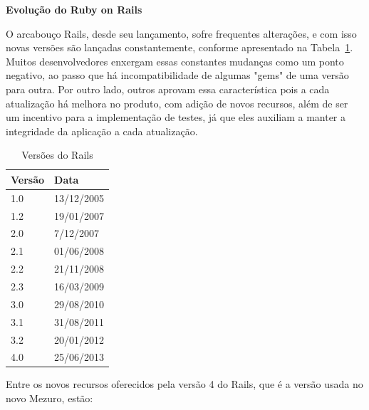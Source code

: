 
\textbf{Evolução do Ruby on Rails}

O arcabouço Rails, desde seu lançamento, sofre frequentes alterações, e com isso novas versões são lançadas constantemente, conforme apresentado na Tabela~\ref{tab:rails_versions}. Muitos desenvolvedores enxergam essas constantes mudanças como um ponto negativo, ao passo que há incompatibilidade de algumas "gems" de uma versão para outra. Por outro lado, outros aprovam essa característica pois a cada atualização há melhora no produto, com adição de novos recursos, além de ser um incentivo para a implementação de testes, já que eles auxiliam a manter a integridade da aplicação a cada atualização.

\begin{table}[H]
\begin{center}
    \begin{tabular}{ | l | l |}
    \hline
    Versão & Data \\ \hline
    1.0 & 13/12/2005 \\ \hline
    1.2 & 19/01/2007 \\ \hline
    2.0 & 7/12/2007 \\ \hline
    2.1 & 01/06/2008 \\ \hline
    2.2 & 21/11/2008 \\ \hline
    2.3 & 16/03/2009 \\ \hline
    3.0 & 29/08/2010 \\ \hline
    3.1 & 31/08/2011 \\ \hline
    3.2 & 20/01/2012 \\ \hline
    4.0 & 25/06/2013 \\ \hline
    \end{tabular}
    \caption{Versões do Rails}
    \label{tab:rails_versions}
\end{center}
\end{table}

Entre os novos recursos oferecidos pela versão 4 do Rails, que é a versão usada no novo Mezuro, estão:

